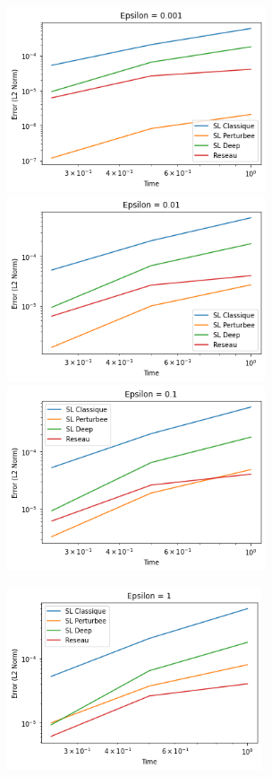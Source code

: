 \documentclass{article}
\begin{document}
\begin{figure}[!h]
    \centering
    \includegraphics[width=0.68\textwidth]{images/20ep22.png}
    \includegraphics[width=0.68\textwidth]{images/20ep23.png}
    \includegraphics[width=0.68\textwidth]{images/20ep24.png}
\end{figure}

\newpage
\begin{figure}[!h]
    \centering
    \includegraphics[width=0.67\textwidth]{images/20ep25.png}
\end{figure}
\end{document}
